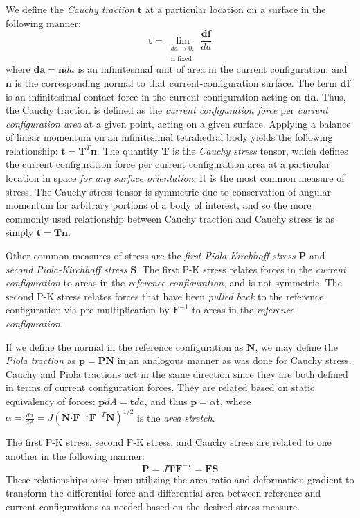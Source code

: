 We define the \textit{Cauchy traction} $\bm{t}$ at a particular location on a surface in the following manner:
\begin{equation}
\bm{t} = \lim_{\substack{{da} \rightarrow 0, \\ {\bm{n} \text{\ fixed}}}} \frac{{\bm{df}}}{da}
\end{equation}
where $\bm{da} = \bm{n}da$ is an infinitesimal unit of area in the current configuration, and $\bm{n}$ is the corresponding normal to that current-configuration surface. The term $\bm{df}$ is an infinitesimal contact force in the current configuration acting on $\bm{da}$. Thus, the Cauchy traction is defined as the \textit{current configuration force} per \textit{current configuration area} at a given point, acting on a given surface. Applying a balance of linear momentum on an infinitesimal tetrahedral body yields the following relationship: $\bm{t} = \bm{T}^T\bm{n}$. The quantity $\bm{T}$ is the \textit{Cauchy stress} tensor, which defines the current configuration force per current configuration area at a particular location in space \textit{for any surface orientation}. It is the most common measure of stress. The Cauchy stress tensor is symmetric due to conservation of angular momentum for arbitrary portions of a body of interest, and so the more commonly used relationship between Cauchy traction and Cauchy stress is as simply $\bm{t} = \bm{T}\bm{n}$.

Other common measures of stress are the \textit{first Piola-Kirchhoff stress} $\bm{P}$ and \textit{second Piola-Kirchhoff stress} $\bm{S}$. The first P-K stress relates forces in the \textit{current configuration} to areas in the \textit{reference configuration}, and is not symmetric. The second P-K stress relates forces that have been \textit{pulled back} to the reference configuration via pre-multiplication by $\bm{F}^{-1}$ to areas in the \textit{reference configuration}.

If we define the normal in the reference configuration as $\bm{N}$, we may define the \textit{Piola traction} as $\bm{p} = \bm{P}\bm{N}$ in an analogous manner as was done for Cauchy stress. Cauchy and Piola tractions act in the same direction since they are both defined in terms of current configuration forces. They are related based on static equivalency of forces: $\bm{p}dA = \bm{t}da$, and thus $\bm{p} = \alpha\bm{t}$, where $\alpha = \frac{da}{dA} = J\left(\bm{N} \bm{\cdot} \bm{F}^{-1}\bm{F}^{-T}\bm{N}\right)^{1/2}$ is the \textit{area stretch}.

The first P-K stress, second P-K stress, and Cauchy stress are related to one another in the following manner:
\begin{equation}
\bm{P} = J\bm{T}\bm{F}^{-T} = \bm{F}\bm{S}
\end{equation}
These relationships arise from utilizing the area ratio and deformation gradient to transform the differential force and differential area between reference and current configurations as needed based on the desired stress measure.

